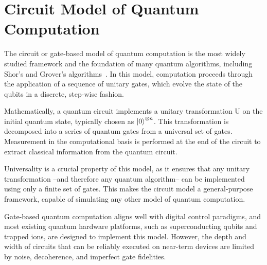 \section{Circuit Model of Quantum Computation}
\label{Section:GateModelQC}

The circuit or gate-based model of quantum computation is the most widely studied framework and the foundation of many quantum algorithms, including Shor's and Grover's algorithms~\cite{nielsen00}. In this model, computation proceeds through the application of a sequence of unitary gates, which evolve the state of the qubits in a discrete, step-wise fashion.

Mathematically, a quantum circuit implements a unitary transformation U on the initial quantum state, typically chosen as $\ket{0}^{\otimes n}$. This transformation is decomposed into a series of quantum gates from a universal set of gates. Measurement in the computational basis is performed at the end of the circuit to extract classical information from the quantum circuit.

Universality is a crucial property of this model, as it ensures that any unitary transformation --and therefore any quantum algorithm-- can be implemented using only a finite set of gates. This makes the circuit model a general-purpose framework, capable of simulating any other model of quantum computation.

Gate-based quantum computation aligns well with digital control paradigms, and most existing quantum hardware platforms, such as superconducting qubits and trapped ions, are designed to implement this model. However, the depth and width of circuits that can be reliably executed on near-term devices are limited by noise, decoherence, and imperfect gate fidelities.